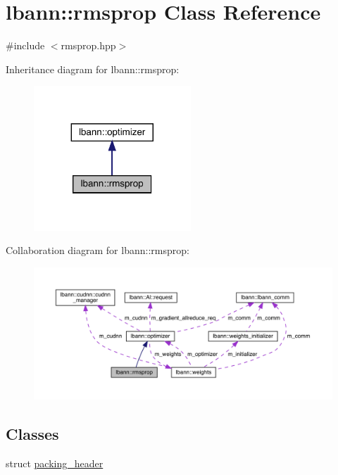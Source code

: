 \hypertarget{classlbann_1_1rmsprop}{}\section{lbann\+:\+:rmsprop Class Reference}
\label{classlbann_1_1rmsprop}


{\ttfamily \#include $<$rmsprop.\+hpp$>$}



Inheritance diagram for lbann\+:\+:rmsprop\+:\nopagebreak
\begin{figure}[H]
\begin{center}
\leavevmode
\includegraphics[width=167pt]{classlbann_1_1rmsprop__inherit__graph}
\end{center}
\end{figure}


Collaboration diagram for lbann\+:\+:rmsprop\+:\nopagebreak
\begin{figure}[H]
\begin{center}
\leavevmode
\includegraphics[width=350pt]{classlbann_1_1rmsprop__coll__graph}
\end{center}
\end{figure}
\subsection*{Classes}
\begin{DoxyCompactItemize}
\item 
struct \hyperlink{structlbann_1_1rmsprop_1_1packing__header}{packing\+\_\+header}
\end{DoxyCompactItemize}

